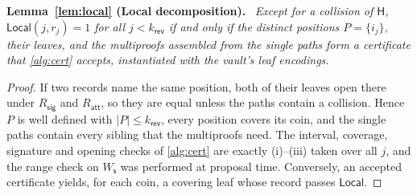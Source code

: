 \documentclass[10pt,journal,compsoc]{IEEEtran}
\theoremstyle{tplain}
\theoremstyle{tdef}
\theoremstyle{remark}
\newcommand{\Ws}{W_{\mathsf{s}}}
\newcommand{\Rsig}{R_{\mathsf{sig}}}
\newcommand{\Ratt}{R_{\mathsf{att}}}
\newcommand{\kr}{k_{\mathsf{rev}}}
\newcommand{\Hash}{\mathsf{H}}
\newenvironment{restate}[1]{\par\smallskip\noindent\textbf{#1.}\ \itshape\ignorespaces}{\par\smallskip}
\begin{document}
\begin{restate}{Lemma~\ref{lem:local} (Local decomposition)}
Except for a collision of $\Hash$, $\mathsf{Local}(j,r_j)=1$ for all $j<\kr$ if and only if the distinct positions $P=\{i_j\}$, their leaves, and the multiproofs assembled from the single paths form a certificate that \cref{alg:cert} accepts, instantiated with the vault's leaf encodings.
\end{restate}
\begin{proof}
If two records name the same position, both of their leaves open there under $\Rsig$ and $\Ratt$, so they are equal unless the paths contain a collision. Hence $P$ is well defined with $|P|\le\kr$, every position covers its coin, and the single paths contain every sibling that the multiproofs need. The interval, coverage, signature and opening checks of \cref{alg:cert} are exactly (i)--(iii) taken over all $j$, and the range check on $\Ws$ was performed at proposal time. Conversely, an accepted certificate yields, for each coin, a covering leaf whose record passes $\mathsf{Local}$.
\end{proof}
\end{document}
